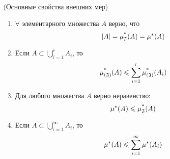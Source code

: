 \begin{theorem} (Основные свойства внешних мер)
	\begin{enumerate}
		\item $\forall$ элементарного множества $A$ верно, что
		\[
			|A| = \operatorname{\mu^*_\mathfrak{J}}(A) = \mu^*(A)
		\]
		
		\item Если $A \subset \bigcup_{i = 1}^r A_i$, то
		\[
			\operatorname{\mu^*_{(\mathfrak{J})}}(A) \leqslant \sum\limits_{i = 1}^r \operatorname{\mu^*_{(\mathfrak{J})}}(A_i)
		\]
		
		\item Для любого множества $A$ верно неравенство:
		\[
			\mu^*(A) \leqslant \operatorname{\mu^*_\mathfrak{J}}(A)
		\]
		
		\item Если $A \subset \bigcup_{i = 1}^\infty A_i$, то
		\[
			\mu^*(A) \leqslant \sum\limits_{i = 1}^\infty \mu^*(A_i)
		\]
	\end{enumerate}
\end{theorem}


